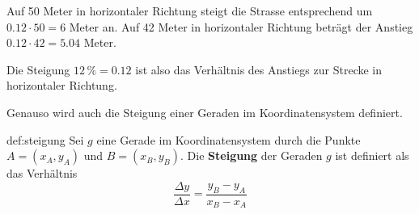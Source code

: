 Auf 50 Meter in horizontaler Richtung steigt die Strasse entsprechend um $0.12 \cdot 50 = 6$ Meter an. Auf 42 Meter in horizontaler Richtung beträgt der Anstieg $0.12 \cdot 42 = 5.04$ Meter.

Die Steigung $12\,\% = 0.12$ ist also das Verhältnis des Anstiegs zur Strecke in horizontaler Richtung.

Genauso wird auch die Steigung einer Geraden im Koordinatensystem definiert.
\begin{deff}[Steigung]{def:steigung}
    Sei $g$ eine Gerade im Koordinatensystem durch die Punkte $A = (x_{A},y_{A})$ und $B = (x_{B},y_{B})$. Die \textbf{Steigung} der Geraden $g$ ist definiert als das Verhältnis
    \[\frac{\Delta y}{\Delta x} = \frac{y_{B} - y_{A}}{x_{B} - x_{A}}\]
    \begin{center}
    \end{center}
\end{deff}

